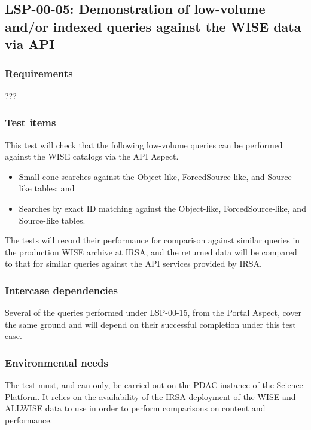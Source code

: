 \subsection{LSP-00-05: Demonstration of low-volume and/or indexed queries against the WISE data via API}
\label{lsp-00-05}

\subsubsection{Requirements}

???

\subsubsection{Test items}

This test will check that the following low-volume queries can be performed against the WISE catalogs via the API Aspect.

\begin{itemize}

  \item{Small cone searches against the Object-like, ForcedSource-like, and Source-like tables; and}
  \item{Searches by exact ID matching against the Object-like, ForcedSource-like, and Source-like tables.}

\end{itemize}

The tests will record their performance for comparison against similar queries in the production WISE archive at IRSA,
and the returned data will be compared to that for similar queries against the API services provided by IRSA.

\subsubsection{Intercase dependencies}

Several of the queries performed under LSP-00-15, from the Portal Aspect, cover the same ground and will depend on their successful completion under this test case.

\subsubsection{Environmental needs}

The test must, and can only, be carried out on the PDAC instance of the Science Platform.
It relies on the availability of the IRSA deployment of the WISE and ALLWISE data to use in order to perform comparisons on content and performance.

